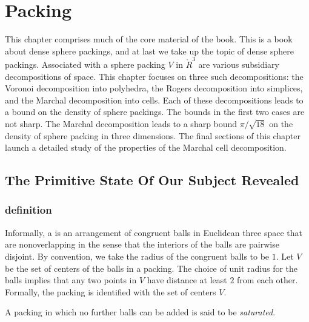 
\chapter{Packing}

\begin{summary}
This chapter comprises much of the core material of the book.  This is a book
about dense sphere packings, and at last we take up the topic of dense sphere
packings.
 Associated with a sphere packing $V$ in $\ring{R}^3$
are various subsidiary decompositions of space.
This chapter focuses on three such decompositions: the Voronoi decomposition into
polyhedra,  the Rogers decomposition into simplices, and the Marchal decomposition
into cells.  Each of these decompositions leads to a bound on the density of sphere
packings.  The bounds in the first two cases are not sharp.  The Marchal decomposition
leads to a sharp bound $\pi/\sqrt{18}$ on the density of sphere packing in three
dimensions.  The final sections of this chapter launch a detailed study of the properties
of the Marchal cell decomposition.
\end{summary}

\section{The Primitive State Of Our Subject Revealed}


\subsection{definition}



Informally, a  is an arrangement of congruent
balls in Euclidean three space that are nonoverlapping in the sense
that the interiors of the balls are pairwise disjoint.  By convention,
we take the radius of the congruent balls to be $1$.
Let $ V$ be the set of centers of the balls in a
packing. The choice of unit radius for the
balls implies that any two points in $ V$ have distance at
least $2$ from each other. 
 Formally, the packing is identified
with the set of centers $V$.
%

%
A packing in which no further balls can be added is said to be {\it
saturated}.

